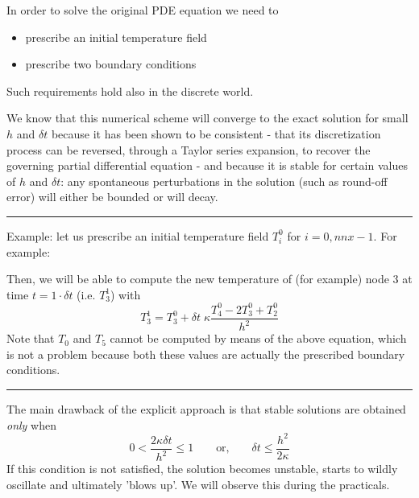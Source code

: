 \begin{center}

\end{center}

\noindent In order to solve the original PDE equation we need to
\begin{itemize}
\item prescribe an initial temperature field
\item prescribe two boundary conditions 
\end{itemize}
Such requirements hold also in the discrete world. 

We know that this numerical scheme will converge to the exact solution for
small $h$ and $\delta t$ because it has been shown to be {\color{olive}consistent} - 
that its discretization process
can be reversed, through a Taylor series expansion, to recover the governing partial differential equation -
and because it is {\color{olive}stable} for certain values of
$h$ and $\delta t$: any spontaneous perturbations in the solution (such as round-off error) 
will either be bounded or will decay.



\begin{center}
\begin{minipage}[t]{0.77\textwidth}
\par\noindent\rule{\textwidth}{0.4pt}
{\color{blue} Example}: let us prescribe an initial temperature field $T_i^0$ for $i=0,nnx-1$.
For example:

\begin{center}

\end{center}

Then, we will be able to compute the new temperature of (for example) 
node 3 at time $t=1\cdot \delta t$ 
(i.e. $T_3^1$) with 
\[
T_3^{1}=T_3^0 + \delta t \; \kappa \frac{T_{4}^0 - 2T_3^0 + T_{2}^0}{h^2}
\]
Note that $T_0$ and $T_5$ cannot be computed by means of the above equation, 
which is not a problem because both these values are actually the prescribed 
boundary conditions. 

\par\noindent\rule{\textwidth}{0.4pt}
\end{minipage}
\end{center}


\noindent The main drawback of the explicit approach is that stable solutions are
obtained {\it only} when
\[
0 < \frac{2\kappa \delta t}{h^2} \leq1
\qquad
\text{or,}
\qquad
\delta t \leq \frac{h^2}{2 \kappa}
\]
If this condition is not satisfied, the solution becomes {\color{olive} unstable}, starts to
wildly oscillate and ultimately 'blows up'. We will observe this during the practicals. 

